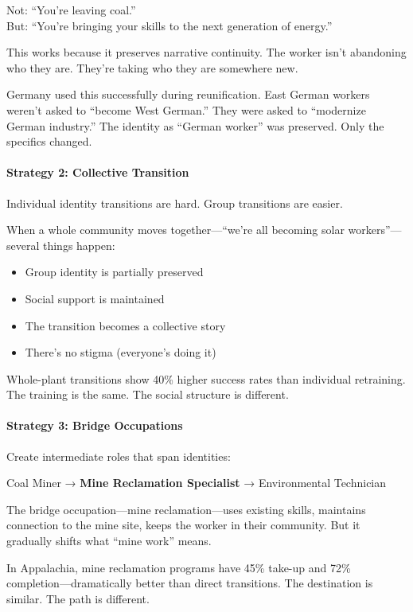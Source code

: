 Not: ``You're leaving coal.''\\
But: ``You're bringing your skills to the next generation of energy.''

This works because it preserves narrative continuity. The worker isn't 
abandoning who they are. They're taking who they are somewhere new.

Germany used this successfully during reunification. East German workers 
weren't asked to ``become West German.'' They were asked to ``modernize 
German industry.'' The identity as ``German worker'' was preserved. 
Only the specifics changed.

\paragraph{Strategy 2: Collective Transition}

Individual identity transitions are hard. Group transitions are easier.

When a whole community moves together---``we're all becoming solar 
workers''---several things happen:
\begin{itemize}
    \item Group identity is partially preserved
    \item Social support is maintained
    \item The transition becomes a collective story
    \item There's no stigma (everyone's doing it)
\end{itemize}

Whole-plant transitions show 40\% higher success rates than individual 
retraining. The training is the same. The social structure is different.

\paragraph{Strategy 3: Bridge Occupations}

Create intermediate roles that span identities:

\begin{center}
Coal Miner → \textbf{Mine Reclamation Specialist} → Environmental Technician
\end{center}

The bridge occupation---mine reclamation---uses existing skills, maintains 
connection to the mine site, keeps the worker in their community. But it 
gradually shifts what ``mine work'' means.

In Appalachia, mine reclamation programs have 45\% take-up and 72\% 
completion---dramatically better than direct transitions. The destination 
is similar. The path is different.

